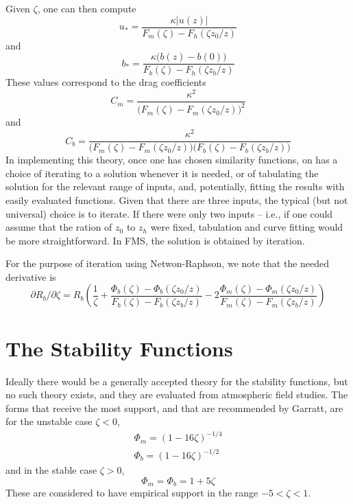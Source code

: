 \documentclass[12pt, letterpaper]{article}
\begin{document}
Given $\zeta$, one can then compute
\begin{equation}
  u_* = \frac{\kappa |u(z)|}{F_m(\zeta) - F_h(\zeta z_0/z)}
\end{equation}
and
\begin{equation}
  b_* = \frac{\kappa\big(b(z) - b(0)\big)}{F_b(\zeta)-F_h(\zeta z_b/z)}
\end{equation}
These values correspond to the drag coefficients
\begin{equation}
  C_m = \frac{\kappa^2}{\big(F_m(\zeta) - F_m(\zeta z_0/z)\big)^2}
\end{equation}
and
\begin{equation}
  C_b = \frac{\kappa^2}{\big(F_m(\zeta) - F_m(\zeta z_0/z)\big)\big(F_b(\zeta)-F_b(\zeta z_b/z)\big)}
\end{equation}
In implementing this theory, once one has chosen similarity functions,
on has a choice of iterating to a solution whenever it is needed, or
of tabulating the solution for the relevant range of inputs, and,
potentially, fitting the results with easily evaluated functions.
Given that there are three inputs, the typical (but not universal)
choice is to iterate.  If there were only two inputs -- i.e., if one
could assume that the ration of $z_0$ to $z_h$ were fixed, tabulation
and curve fitting would be more straightforward.  In FMS, the solution
is obtained by iteration.

For the purpose of iteration using Netwon-Raphson, we note that the
needed derivative is
\begin{equation}
  \partial R_b/\partial \zeta = R_b\left(\frac{1}{\zeta} + \frac{\Phi_b(\zeta)-\Phi_b(\zeta z_0/z)}{F_b(\zeta)-F_b(\zeta z_b/z)} -
  2\frac{\Phi_m(\zeta)-\Phi_m(\zeta z_0/z)}{F_m(\zeta)-F_m(\zeta z_b/z)}\right)
\end{equation}

\section{The Stability Functions}

Ideally there would be a generally accepted theory for the stability
functions, but no such theory exists, and they are evaluated from
atmospheric field studies.  The forms that receive the most support,
and that are recommended by Garratt, are for the unstable case $\zeta
< 0$,
\begin{gather}
  \Phi_m = (1 - 16\zeta)^{-1/4} \label{eq:stabfuncm} \\
  \Phi_b = (1 - 16\zeta)^{-1/2} \label{eq:stabfuncb}
\end{gather}
and in the stable case $\zeta > 0$,
\begin{equation}
  \Phi_m = \Phi_b = 1+5\zeta \label{eq:stablephi}
\end{equation}
These are considered to have empirical support in the range
$-5<\zeta<1$.
\end{document}
